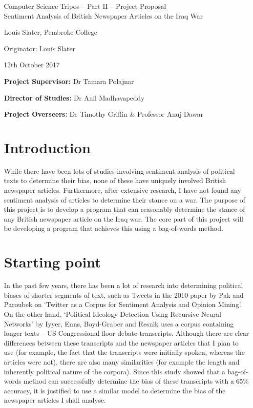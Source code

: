\documentclass[12pt,a4paper,twoside]{article}
\begin{document}
\begin{center}
\Large
Computer Science Tripos -- Part II -- Project Proposal\\[4mm]
\LARGE
Sentiment Analysis of British Newspaper Articles on the Iraq War

\large
Louis Slater, Pembroke College

Originator: Louis Slater

12th October 2017
\end{center}

\vspace{5mm}

\textbf{Project Supervisor:} Dr Tamara Polajnar

\textbf{Director of Studies:} Dr Anil Madhavapeddy

\textbf{Project Overseers:} Dr Timothy Griffin \& Professor Anuj Dawar


\section*{Introduction}
While there have been lots of studies involving sentiment analysis of political texts to determine their bias, none of these have uniquely involved British newspaper articles. Furthermore, after extensive research, I have not found any sentiment analysis of articles to determine their stance on a war. The purpose of this project is to develop a program that can reasonably determine the stance of any British newspaper article on the Iraq war. The core part of this project will be developing a program that achieves this using a bag-of-words method.

\section*{Starting point}
In the past few years, there has been a lot of research into determining political biases of shorter segments of text, such as Tweets in the 2010 paper by Pak and Paroubek on ‘Twitter as a Corpus for Sentiment Analysis and Opinion Mining’. On the other hand, ‘Political Ideology Detection Using Recursive Neural Networks’ by Iyyer, Enns, Boyd-Graber and Resnik uses a corpus containing longer texts – US Congressional floor debate transcripts. Although there are clear differences between these transcripts and the newspaper articles that I plan to use (for example, the fact that the transcripts were initially spoken, whereas the articles were not), there are also many similarities (for example the length and inherently political nature of the corpora). Since this study showed that a bag-of-words method can successfully determine the bias of these transcripts with a 65\% accuracy, it is justified to use a similar model to determine the bias of the newspaper articles I shall analyse.
\end{document}

